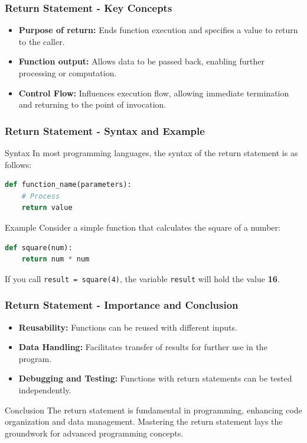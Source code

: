 \documentclass{beamer}
\begin{document}
\begin{frame}[fragile]
    \frametitle{Return Statement - Key Concepts}
    \begin{itemize}
        \item \textbf{Purpose of return:} Ends function execution and specifies a value to return to the caller.
        \item \textbf{Function output:} Allows data to be passed back, enabling further processing or computation.
        \item \textbf{Control Flow:} Influences execution flow, allowing immediate termination and returning to the point of invocation.
    \end{itemize}
\end{frame}

\begin{frame}[fragile]
    \frametitle{Return Statement - Syntax and Example}
    \begin{block}{Syntax}
        In most programming languages, the syntax of the return statement is as follows:
        \begin{lstlisting}[language=Python]
def function_name(parameters):
    # Process
    return value
        \end{lstlisting}
    \end{block}

    \begin{block}{Example}
        Consider a simple function that calculates the square of a number:
        \begin{lstlisting}[language=Python]
def square(num):
    return num * num
        \end{lstlisting}
        If you call \texttt{result = square(4)}, the variable \texttt{result} will hold the value \textbf{16}.
    \end{block}
\end{frame}

\begin{frame}[fragile]
    \frametitle{Return Statement - Importance and Conclusion}
    \begin{itemize}
        \item \textbf{Reusability:} Functions can be reused with different inputs.
        \item \textbf{Data Handling:} Facilitates transfer of results for further use in the program.
        \item \textbf{Debugging and Testing:} Functions with return statements can be tested independently.
    \end{itemize}

    \begin{block}{Conclusion}
        The return statement is fundamental in programming, enhancing code organization and data management. Mastering the return statement lays the groundwork for advanced programming concepts.
    \end{block}
\end{frame}
\end{document}

